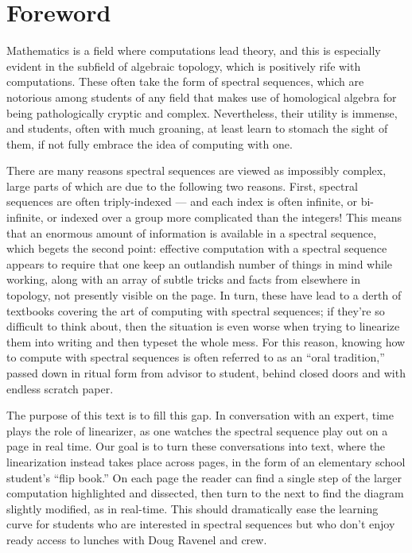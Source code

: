 \section{Foreword}

Mathematics is a field where computations lead theory, and this is especially evident in the subfield of algebraic topology, which is positively rife with computations.  These often take the form of spectral sequences, which are notorious among students of any field that makes use of homological algebra for being pathologically cryptic and complex.  Nevertheless, their utility is immense, and students, often with much groaning, at least learn to stomach the sight of them, if not fully embrace the idea of computing with one.

There are many reasons spectral sequences are viewed as impossibly complex, large parts of which are due to the following two reasons.  First, spectral sequences are often triply-indexed --- and each index is often infinite, or bi-infinite, or indexed over a group more complicated than the integers!  This means that an enormous amount of information is available in a spectral sequence, which begets the second point: effective computation with a spectral sequence appears to require that one keep an outlandish number of things in mind while working, along with an array of subtle tricks and facts from elsewhere in topology, not presently visible on the page.  In turn, these have lead to a derth of textbooks covering the art of computing with spectral sequences; if they're so difficult to think about, then the situation is even worse when trying to linearize them into writing and then typeset the whole mess.  For this reason, knowing how to compute with spectral sequences is often referred to as an ``oral tradition,'' passed down in ritual form from advisor to student, behind closed doors and with endless scratch paper.

The purpose of this text is to fill this gap.  In conversation with an expert, time plays the role of linearizer, as one watches the spectral sequence play out on a page in real time.  Our goal is to turn these conversations into text, where the linearization instead takes place across pages, in the form of an elementary school student's ``flip book.''  On each page the reader can find a single step of the larger computation highlighted and dissected, then turn to the next to find the diagram slightly modified, as in real-time.  This should dramatically ease the learning curve for students who are interested in spectral sequences but who don't enjoy ready access to lunches with Doug Ravenel and crew.

